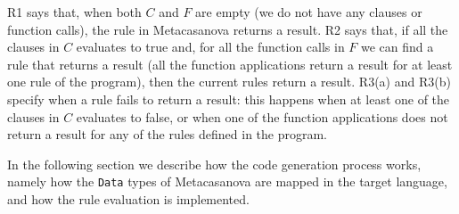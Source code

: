 R1 says that, when both $C$ and $F$ are empty (we do not have any clauses or function calls), the rule in Metacasanova returns a result. R2 says that, if all the clauses in $C$ evaluates to true and, for all the function calls in $F$ we can find a rule that returns a result (all the function applications return a result for at least one rule of the program), then the current rules return a result. R3(a) and R3(b) specify when a rule fails to return a result: this happens when at least one of the clauses in $C$ evaluates to false, or when one of the function applications does not return a result for any of the rules defined in the program.

\vspace{0.2cm}
\noindent
In the following section we describe how the code generation process works, namely how the \texttt{Data} types of Metacasanova are mapped in the target language, and how the rule evaluation is implemented.